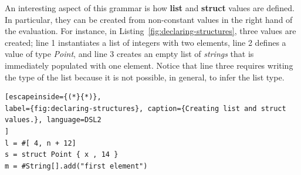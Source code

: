 An interesting aspect of this grammar is how \textbf{list} and \textbf{struct} values are defined.
In particular, they can be created from non-constant values in the right hand of the evaluation.
For instance, in Listing~\ref{fig:declaring-structures}, three values are created; line 1 instantiates a list of integers with two elements, line 2 defines a value of type \textit{Point}, and line 3 creates an empty list of \textit{strings} that is immediately populated with one element.
Notice that line three requires writing the type of the list because it is not possible, in general, to infer the list type. 

\begin{lstlisting}[escapeinside={(*}{*)}, 
label={fig:declaring-structures}, caption={Creating list and struct values.}, language=DSL2
]
l = #[ 4, n + 12]
s = struct Point { x , 14 }
m = #String[].add("first element")
\end{lstlisting}





